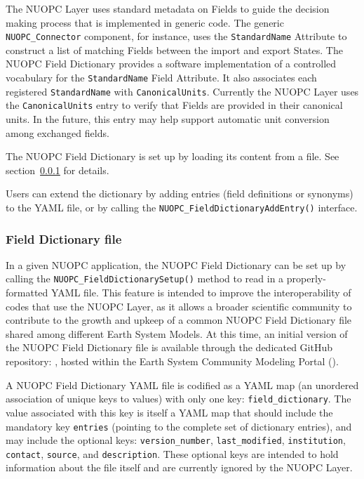 %

\label{field_dictionary}

The NUOPC Layer uses standard metadata on Fields to guide the decision making process that is implemented in generic code. The generic {\tt NUOPC\_Connector} component, for instance, uses the {\tt StandardName} Attribute to construct a list of matching Fields between the import and export States. The NUOPC Field Dictionary provides a software implementation of a controlled vocabulary for the {\tt StandardName} Field Attribute. It also associates each registered {\tt StandardName} with {\tt CanonicalUnits}. Currently the NUOPC Layer uses the {\tt CanonicalUnits} entry to verify that Fields are provided in their canonical units. In the future, this entry may help support automatic unit conversion among exchanged fields.

The NUOPC Field Dictionary is set up by loading its content from a  file. See section~\ref{fd:docfile} for details.

Users can extend the dictionary by adding entries (field definitions or synonyms) to the YAML file, or by calling the {\tt  NUOPC\_FieldDictionaryAddEntry()} interface.


\subsubsection{Field Dictionary file}
\label{fd:docfile}

In a given NUOPC application, the NUOPC Field Dictionary can be set up by calling the {\tt NUOPC\_FieldDictionarySetup()} method to read in a properly-formatted YAML file. This feature is intended to improve the interoperability of codes that use the NUOPC Layer, as it allows a broader scientific community to contribute to the growth and upkeep of a common NUOPC Field Dictionary file shared among different Earth System Models. At this time, an initial version of the NUOPC Field Dictionary file is available through the dedicated GitHub repository: , hosted within the Earth System Community Modeling Portal ().

A NUOPC Field Dictionary YAML file is codified as a YAML map (an unordered association of unique keys to values) with only one key: {\tt field\_dictionary}. The value associated with this key is itself a YAML map that should include the mandatory key {\tt entries} (pointing to the complete set of dictionary entries), and may include the optional keys: {\tt version\_number}, {\tt last\_modified}, {\tt institution}, {\tt contact}, {\tt source}, and {\tt description}. These optional keys are intended to hold information about the file itself and are currently ignored by the NUOPC Layer.

